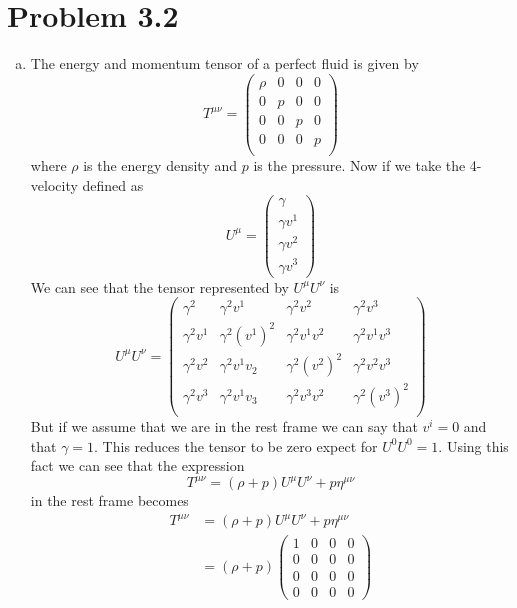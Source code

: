 \documentclass[11pt]{article}
\numberwithin{equation}{section}
\begin{document}
\section{Problem 3.2}
\begin{enumerate}[(a)]
\item
The energy and momentum tensor of a perfect fluid is given by
$$T^{\mu\nu} = \left(\begin{array}{cccc}
		\rho	&0	&0	&0\\
		0	&p	&0	&0\\
		0	&0	&p	&0\\
		0	&0	&0	&p\\
		\end{array}\right)$$
where $\rho$ is the energy density and $p$ is the pressure. Now if we take the 4-velocity defined as
$$U^{\mu} = \left(\begin{array}{c}
		\gamma\\
		\gamma v^1\\
		\gamma v^2\\
		\gamma v^3
	\end{array}\right)$$
We can see that the tensor represented by $U^{\mu}U^{\nu}$ is 
$$U^{\mu}U^{\nu} = \left(\begin{array}{cccc}
	\gamma^2	&\gamma^2v^1 	&\gamma^2v^2	&\gamma^2v^3\\
	\gamma^2v^1	&\gamma^2(v^1)^2&\gamma^2v^1v^2	&\gamma^2v^1v^3\\
	\gamma^2v^2	&\gamma^2v^1v_2	&\gamma^2(v^2)^2&\gamma^2v^2v^3\\
	\gamma^2v^3	&\gamma^2v^1v_3	&\gamma^2v^3v^2	&\gamma^2(v^3)^2\\
			\end{array}\right)$$
But if we assume that we are in the rest frame we can say that $v^i = 0$ and that $\gamma=1$. This reduces the tensor to be zero expect for $U^0U^0 = 1$. Using this fact we can see that the expression
\begin{equation}
T^{\mu\nu} = (\rho+p)U^{\mu}U^{\nu} + p\eta^{\mu\nu}
\label{FluidTensor}
\end{equation}
in the rest frame becomes
\begin{align*}
T^{\mu\nu} &= (\rho+p)U^{\mu}U^{\nu} + p\eta^{\mu\nu}\\
&= (\rho+p)\left(\begin{array}{cccc}
		1 &0 &0 &0\\ 
		0 &0 &0 &0\\ 
		0 &0 &0 &0\\ 
		0 &0 &0 &0
		\end{array}\right)

\end{align*}
\end{enumerate}
\end{document}
